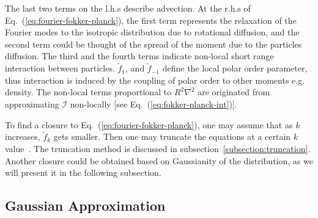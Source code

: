 \documentclass[reprint,floatfix,amsmath,amssymb,aps,pre,showkeys,showpacs,superscriptaddress]{revtex4-1}
\newcommand{\intr}{\mathcal{I}}
\newcommand{\hl}[1]{\textcolor{hlcolor}{#1}}
\newcommand{\req}[1]{Eq.~(\ref{#1})}
\begin{document}
The last two terms on the l.h.s \hl{describe} advection. \hl{At} the r.h.s of \req{eq:fourier-fokker-planck}, the first term represents the relaxation of the Fourier modes to the isotropic distribution due to rotational diffusion, and the second term could be thought of the spread of the moment due to the particles diffusion. The third and the \hl{fourth} terms indicate non-local short range interaction between particles. $\tilde{f}_1$, and $\tilde{f}_{-1}$ \hl{define the local polar order parameter}, thus interaction is induced by the coupling of polar order to other moments e.g. density. The non-local terms proportional to $R^2 \nabla^2$ are originated from approximating $\intr$ non-locally [see \req{eq:fokker-planck-int}].

To find a closure to \req{eq:fourier-fokker-planck}, one may assume that as $k$ increases, $\tilde{f}_k$ gets smaller. Then one may truncate the equations at a certain $k$ value~\cite{Bertin2006,Bertin2009,Peshkov2012,Peshkov2012continuous}. The truncation method is discussed in subsection~\ref{subsection:truncation}.  Another closure could be obtained based on Gaussianity of the distribution, as we will present it in the following subsection.

\subsection{Gaussian Approximation}
\label{subsection:GA}
\end{document}
